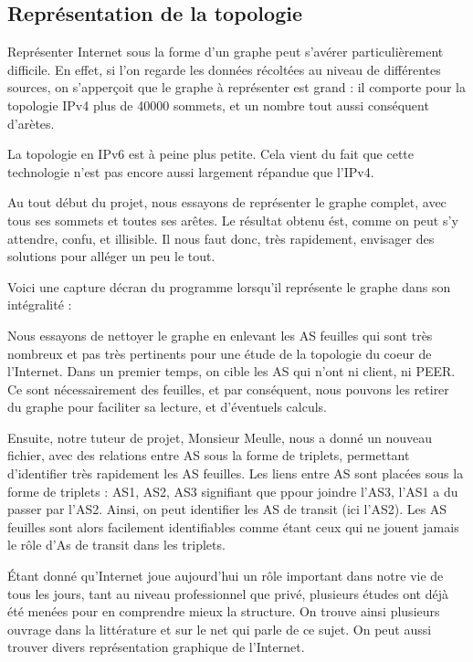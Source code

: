
% 

\subsection{Repr\'esentation de la topologie}

Repr\'esenter Internet sous la forme d'un graphe peut s'av\'erer particulièrement difficile. En effet, si l'on regarde les donn\'ees r\'ecolt\'ees au niveau de diff\'erentes sources, on s'apperçoit que le graphe \`a repr\'esenter est grand : il comporte pour la topologie IPv4 plus de 40000 sommets, et un nombre tout aussi cons\'equent d'ar\`etes.
\par
La topologie en IPv6 est \`a peine plus petite. Cela vient du fait que cette technologie n'est pas encore aussi largement r\'epandue que l'IPv4.

\par
Au tout d\'ebut du projet, nous essayons de repr\'esenter le graphe complet, avec tous ses sommets et toutes ses ar\^etes. Le r\'esultat obtenu \'est, comme on peut s'y attendre, confu, et illisible. Il nous faut donc, tr\`es rapidement, envisager des solutions pour all\'eger un peu le tout.
\par
Voici une capture d\'ecran du programme lorsqu'il repr\'esente le graphe dans son int\'egralit\'e :

\par
Nous essayons de nettoyer le graphe en enlevant les AS feuilles qui sont tr\`es nombreux et pas tr\`es pertinents pour une \'etude de la topologie du coeur de l'Internet. Dans un premier temps, on cible les AS qui n'ont ni client, ni PEER. Ce sont n\'ecessairement des feuilles, et par cons\'equent, nous pouvons les retirer du graphe pour faciliter sa lecture, et d'\'eventuels calculs.
\par
Ensuite, notre tuteur de projet, Monsieur Meulle, nous a donn\'e un nouveau fichier, avec des relations entre AS sous la forme de triplets, permettant d'identifier tr\`es rapidement les AS feuilles.
Les liens entre AS sont plac\'ees sous la forme de triplets : {AS1, AS2, AS3} signifiant que ppour joindre l'AS3, l'AS1 a du passer par l'AS2. Ainsi, on peut identifier les AS de transit (ici l'AS2). Les AS feuilles sont alors facilement identifiables comme \'etant ceux qui ne jouent jamais le r\^ole d'As de transit dans les triplets.
\par
\'Etant donn\'e qu'Internet joue aujourd'hui un r\^ole important dans notre vie de tous les jours, tant au niveau professionnel que priv\'e, plusieurs \'etudes ont d\'ej\`a \'et\'e men\'ees pour en comprendre mieux la structure.
On trouve ainsi plusieurs ouvrage dans la litt\'erature et sur le net qui parle de ce sujet. On peut aussi trouver divers repr\'esentation graphique de l'Internet.

%